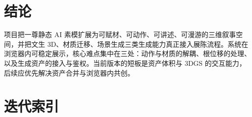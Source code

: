 \documentclass[UTF8,a4paper,11pt]{ctexart}
\begin{document}
\section{结论}

项目把一尊静态 AI 素模扩展为可赋材、可动作、可讲述、可漫游的三维叙事空间，并把文生 3D、材质迁移、场景生成三类生成能力真正接入展陈流程。系统在浏览器内可稳定展示，核心难点集中在三处：动作与材质的解耦、根位移的处理、以及生成资产的接入与鉴权。当前版本的短板是资产体积与 3DGS 的交互能力，后续应优先解决资产合并与浏览器内共创。

\appendix
\section{迭代索引}
\end{document}
